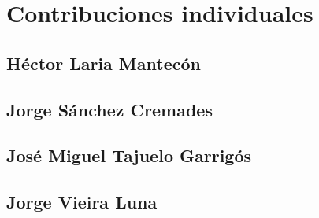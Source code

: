 \chapter{Contribuciones individuales}

\section{Héctor Laria Mantecón}

\section{Jorge Sánchez Cremades}

\section{José Miguel Tajuelo Garrigós}

\section{Jorge Vieira Luna}
